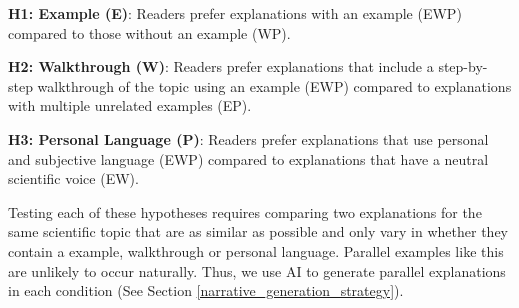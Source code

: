 \textbf{H1: Example (E)}: Readers prefer explanations with an example (EWP) compared to those without an example (WP). 

\textbf{H2: Walkthrough (W)}: Readers prefer explanations that include a step-by-step walkthrough of the topic using an example (EWP) compared to explanations with multiple unrelated examples (EP). 

\textbf{H3: Personal Language (P)}: 
Readers prefer explanations that use personal and subjective language (EWP) compared to explanations that have a neutral scientific voice (EW).


Testing each of these hypotheses requires comparing two explanations for the same scientific topic that are as similar as possible and only vary in whether they contain a example, walkthrough or personal language. Parallel examples like this are unlikely to occur naturally. Thus, we use AI to generate parallel explanations in each condition (See Section \ref{narrative_generation_strategy}). 







